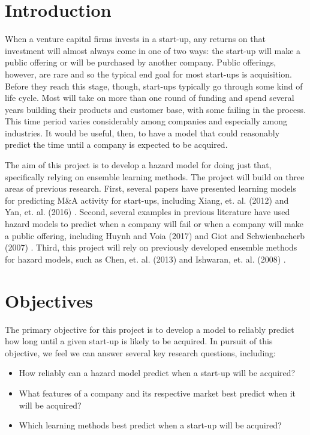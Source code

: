 \section{Introduction}

When a venture capital firms invests in a start-up, any returns on that investment will almost always come in one of two ways: the start-up will make a public offering or will be purchased by another company. Public offerings, however, are rare and so the typical end goal for most start-ups is acquisition. Before they reach this stage, though, start-ups typically go through some kind of life cycle. Most will take on more than one round of funding and spend several years building their products and customer base, with some failing in the process. This time period varies considerably among companies and especially among industries. It would be useful, then, to have a model that could reasonably predict the time until a company is expected to be acquired.

The aim of this project is to develop a hazard model for doing just that, specifically relying on ensemble learning methods. The project will build on three areas of previous research. First, several papers have presented learning models for predicting M\&A activity for start-ups, including Xiang, et. al. (2012) \cite{xiang2012supervised} and Yan, et. al. (2016) \cite{yan2016modeling}. Second, several examples in previous literature have used hazard models to predict when a company will fail or when a company will make a public offering, including Huynh and Voia (2017) \cite{voia2017hazard} and Giot and Schwienbacherb (2007) \cite{giot2007ipos}. Third, this project will rely on previously developed ensemble methods for hazard models, such as Chen, et. al. (2013) \cite{chen2013gradient} and Ishwaran, et. al. (2008) \cite{ishwaran2008randomforest}.

\section{Objectives}

The primary objective for this project is to develop a model to reliably predict how long until a given start-up is likely to be acquired. In pursuit of this objective, we feel we can answer several key research questions, including:

\begin{itemize}
	\item
		How reliably can a hazard model predict when a start-up will be acquired?
	\item
		What features of a company and its respective market best predict when it will be acquired?
	\item
		Which learning methods best predict when a start-up will be acquired?
\end{itemize}

